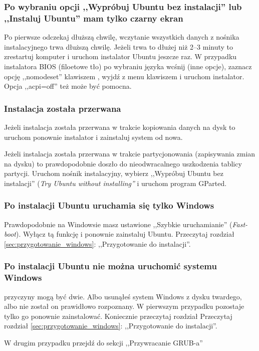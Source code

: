 \subsubsection{Po wybraniu opcji ,,Wypróbuj Ubuntu bez instalacji'' lub ,,Instaluj Ubuntu'' mam tylko czarny ekran}
Po pierwsze odczekaj dłuższą chwilę, wczytanie wszystkich danych z nośnika instalacyjnego trwa dłuższą chwilę. Jeżeli trwa to dłużej niż 2--3 minuty to zrestartuj komputer i uruchom instalator Ubuntu jeszcze raz. W przypadku instalatora BIOS (filoetowe tło) po wybraniu języka wcśnij  (inne opcje), zaznacz opcję ,,nomodeset'' klawiszem \keys{\returnwin}, wyjdź z menu klawiszem  i uruchom instalator. Opcja ,,acpi=off'' też może być pomocna.

\subsubsection{Instalacja została przerwana}
Jeżeli instalacja została przerwana w trakcie kopiowania danych na dysk to uruchom ponownie instalator i zainstaluj system od nowa.

Jeżeli instalacja została przerwana w trakcie partycjonowania (zapisywania zmian na dysku) to prawdopodobnie doszło do nieodwracalnego uszkodzenia tablicy partycji. Uruchom nośnik instalacyjny, wybierz ,,Wypróbuj Ubuntu bez instalacji'' (\textit{Try Ubuntu without installing''} i uruchom program GParted.

\subsubsection{Po instalacji Ubuntu uruchamia się tylko Windows}
Prawdopodobnie na Windowsie masz ustawione ,,Szybkie uruchamianie'' (\textit{Fast-boot}). Wyłącz tą funkcję i ponownie zainstaluj Ubuntu. Przeczytaj rozdział \ref{sec:przygotowanie_windows}: ,,Przygotowanie do instalacji''.

\subsubsection{Po instalacji Ubuntu nie można uruchomić systemu Windows}
przyczyny mogą być dwie. Albo usunąłeś system Windows z dysku twardego, albo nie został on prawidłowo rozpoznany. W pierwszym przypadku pozostaje tylko go ponownie zainstalować. Koniecznie przeczytaj rozdział Przeczytaj rozdział \ref{sec:przygotowanie_windows}: ,,Przygotowanie do instalacji''.

W drugim przypadku przejdź do sekcji ,,Przywracanie GRUB-a''

